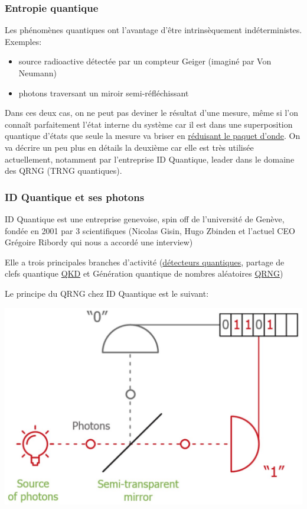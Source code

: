 \documentclass{scrartcl}
\begin{document}
\subsubsection{Entropie quantique}
Les phénomènes quantiques ont l’avantage d’être intrinsèquement indéterministes. 
Exemples: 
\begin{itemize}
\item source radioactive détectée par un compteur Geiger (imaginé par Von Neumann)
\item photons traversant un miroir semi-réfléchissant
\end{itemize}
Dans ces deux cas, on ne peut pas deviner le résultat d’une mesure, même si l'on connaît parfaitement l’état interne du système car il est dans une superposition quantique d’états que seule la mesure va briser en \href{https://fr.wikipedia.org/wiki/R\%C3\%A9duction_du_paquet_d\%27onde}{réduisant le paquet d’onde}.
On va décrire un peu plus en détails la deuxième car elle est très utilisée actuellement, notamment par l'entreprise ID Quantique, leader dans le domaine des QRNG (TRNG quantiques).

\subsubsection{ID Quantique et ses photons}
ID Quantique est une entreprise genevoise, spin off de l’université de Genève, fondée en 2001 par 3 scientifiques (Nicolas Gisin, Hugo Zbinden et l’actuel CEO Grégoire Ribordy qui nous a accordé une interview) \par
Elle a trois principales branches d’activité (\href{https://www.idquantique.com/quantum-sensing/overview/}{détecteurs quantiques}, partage de clefs quantique \href{https://www.idquantique.com/quantum-safe-security/overview/}{QKD} et Génération quantique de nombres aléatoires \href{https://www.idquantique.com/random-number-generation/overview/}{QRNG}) \par
Le principe du QRNG chez ID Quantique est le suivant:
\begin{center}
  \includegraphics[scale=0.25]{img/Figure1.OpticalSystemUsedTuGenerateRandomNumbers.jpg}  
\end{center}
\end{document}
